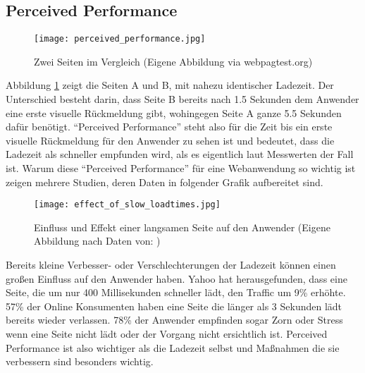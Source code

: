 	\pagebreak


	\subsection{Perceived Performance} %
	\label{sub:perceived_performance}
		\begin{figure}[htbp]
			\begin{center}
				\texttt{[image: perceived\_performance.jpg]}
				\caption{Zwei Seiten im Vergleich (Eigene Abbildung via webpagtest.org)}
				\label{fig:perceived_performance}
			\end{center}
		\end{figure}

		Abbildung \ref{fig:perceived_performance} zeigt die Seiten A und B, mit nahezu identischer Ladezeit. Der Unterschied besteht darin, dass Seite B bereits nach 1.5 Sekunden dem Anwender eine erste visuelle Rückmeldung gibt, wohingegen Seite A ganze 5.5 Sekunden dafür benötigt.
		"`Perceived Performance"' steht also für die Zeit bis ein erste visuelle Rückmeldung für den Anwender zu sehen ist und bedeutet, dass die Ladezeit als schneller empfunden wird, als es eigentlich laut Messwerten der Fall ist. Warum diese "`Perceived Performance"' für eine Webanwendung so wichtig ist zeigen mehrere Studien, deren Daten in folgender Grafik aufbereitet sind.

		\begin{figure}[htbp]
			\begin{center}
				\texttt{[image: effect\_of\_slow\_loadtimes.jpg]}
				\caption{Einfluss und Effekt einer langsamen Seite auf den Anwender (Eigene Abbildung nach Daten von: \autocite[p. 8]{radware14})}
				\label{fig:effect_of_slow_loadtimes}
			\end{center}
		\end{figure}

		Bereits kleine Verbesser- oder Verschlechterungen der Ladezeit können einen großen Einfluss auf den Anwender haben. Yahoo hat herausgefunden, dass eine Seite, die um nur 400 Millisekunden schneller lädt, den Traffic um 9\% erhöhte.\autocite{stefanov08} 57\% der Online Konsumenten haben eine Seite die länger als 3 Sekunden lädt bereits wieder verlassen. 78\% der Anwender empfinden sogar Zorn oder Stress wenn eine Seite nicht lädt oder der Vorgang nicht ersichtlich ist. Perceived Performance ist also wichtiger als die Ladezeit selbst und Maßnahmen die sie verbessern sind besonders wichtig.

